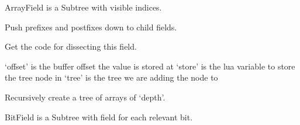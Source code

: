 \documentclass[A4paper,10pt,english]{sphinxmanual}
\begin{document}
\begin{fulllineitems}
\label{devel/code:field.ArrayField}
ArrayField is a Subtree with visible indices.

\begin{fulllineitems}
\label{devel/code:field.ArrayField.push_modifiers}
Push prefixes and postfixes down to child fields.

\end{fulllineitems}


\begin{fulllineitems}
\label{devel/code:field.ArrayField.get_code}
Get the code for dissecting this field.

`offset' is the buffer offset the value is stored at
`store' is the lua variable to store the tree node in
`tree' is the tree we are adding the node to

\end{fulllineitems}


\begin{fulllineitems}
\label{devel/code:field.ArrayField.create}
Recursively create a tree of arrays of `depth'.

\end{fulllineitems}


\end{fulllineitems}


\begin{fulllineitems}
\label{devel/code:field.BitField}
BitField is a Subtree with field for each relevant bit.

\end{fulllineitems}

\end{document}
